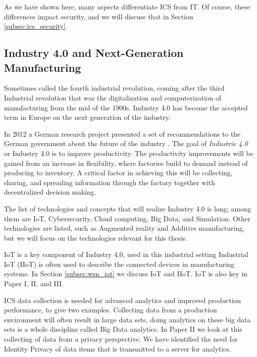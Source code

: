 As we have shown here, many aspects differentiate ICS from IT. Of course, these differences impact security, and we will discuss that in Section \ref{subsec:ics_security}.

\subsection{Industry 4.0 and Next-Generation Manufacturing}
\label{subsec:i4}
Sometimes called the fourth industrial revolution, coming after the third Industrial revolution that was the digitalization and computerization of manufacturing from the mid of the 1900s. Industry 4.0 has become the accepted term in Europe on the next generation of the industry.

In 2012 a German research project presented a set of recommendations to the German government about the future of the industry \cite{kagermann2013recommendations}. The goal of \emph{Industrie 4.0} or Industry 4.0 is to improve productivity. The productivity improvements will be gained from an increase in flexibility, where factories build to demand instead of producing to inventory. A critical factor in achieving this will be collecting, sharing, and spreading information through the factory together with decentralized decision making.

The list of technologies and concepts that will realize Industry 4.0 is long; among them are IoT, Cybersecurity, Cloud computing, Big Data, and Simulation. Other technologies are listed, such as Augmented reality and Additive manufacturing, but we will focus on the technologies relevant for this thesis.

IoT is a key component of Industry 4.0, used in this industrial setting Industrial IoT (IIoT) is often used to describe the connected devices in manufacturing systems. In Section \ref{subsec:wsn_iot} we discuss IoT and IIoT. IoT is also key in Paper I, II, and III. 

ICS data collection is needed for advanced analytics and improved production performance, to give two examples. Collecting data from a production environment will often result in large data sets, doing analytics on these big data sets is a whole discipline called Big Data analytics. In Paper II we look at this collecting of data from a privacy perspective. We have identified the 
need for Identity Privacy of data items that is transmitted to a server for analytics.  

 
